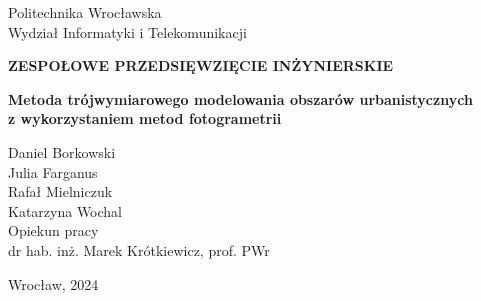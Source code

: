 \begin{titlepage}
    \begin{center}
        \Large
        Politechnika Wrocławska\\
        Wydział Informatyki i Telekomunikacji\\
        \vspace*{1cm}
            
        \Huge
        \textbf{ZESPOŁOWE PRZEDSIĘWZIĘCIE INŻYNIERSKIE}

        \vspace{1.5cm}
        \huge
        \textbf{Metoda trójwymiarowego modelowania obszarów urbanistycznych \\z wykorzystaniem metod fotogrametrii}

        \vspace{1.5cm}
        \LARGE
        Daniel Borkowski\\
        Julia Farganus\\
        Rafał Mielniczuk\\
        Katarzyna Wochal\\

        \vspace{1.5cm}
        Opiekun pracy\\
        dr hab. inż. Marek Krótkiewicz, prof. PWr

        \vfill
            
            
        \vspace{0.8cm}
            
            
        \Large
        Wrocław, 2024
        
            
    \end{center}
\end{titlepage}
